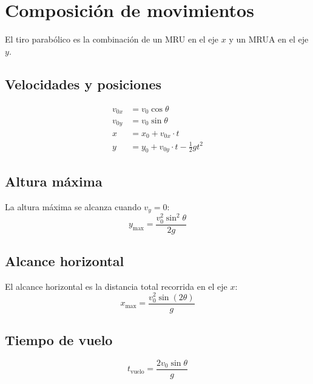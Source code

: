 \section{Composición de movimientos}

El tiro parabólico es la combinación de un MRU en el eje \(x\) y un MRUA en el eje \(y\).

\subsection{Velocidades y posiciones}
\begin{align}
    v_{0x} &= v_0 \cos \theta \\
    v_{0y} &= v_0 \sin \theta \\
    x &= x_0 + v_{0x} \cdot t \\
    y &= y_0 + v_{0y} \cdot t - \frac{1}{2} g t^2
\end{align}

\subsection{Altura máxima}
La altura máxima se alcanza cuando \(v_y = 0\):
\begin{equation}
    y_{\max} = \frac{v_0^2 \sin^2 \theta}{2g}
\end{equation}

\subsection{Alcance horizontal}
El alcance horizontal es la distancia total recorrida en el eje \(x\):
\begin{equation}
    x_{\max} = \frac{v_0^2 \sin(2\theta)}{g}
\end{equation}

\subsection{Tiempo de vuelo}
\begin{equation}
    t_{\text{vuelo}} = \frac{2 v_0 \sin \theta}{g}
\end{equation}

